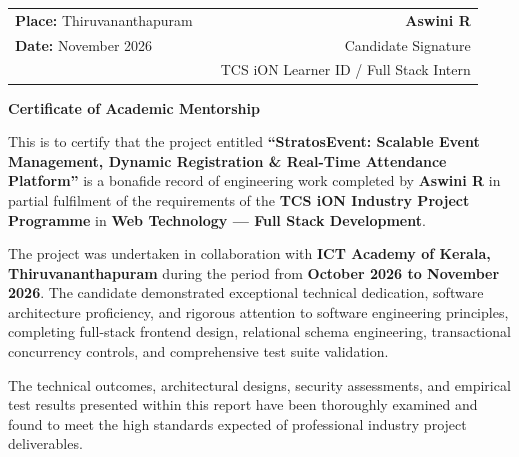\documentclass[11pt,a4paper]{report}
\begin{document}
\noindent
\begin{tabularx}{\textwidth}{lXr}
  \textbf{Place:} Thiruvananthapuram & & \textbf{Aswini R} \\
  \textbf{Date:} November 2026 & & Candidate Signature \\
  & & TCS iON Learner ID / Full Stack Intern
\end{tabularx}

\newpage
\thispagestyle{plain}

\vspace*{0.3in}

\begin{center}
  {\color{TitleBlue}\bfseries\fontsize{18}{22}\selectfont Certificate of Academic Mentorship\par}
\end{center}

\vspace{0.3in}

\noindent
This is to certify that the project entitled \textbf{``StratosEvent: Scalable Event Management, Dynamic Registration \& Real-Time Attendance Platform''} is a bonafide record of engineering work completed by \textbf{Aswini R} in partial fulfilment of the requirements of the \textbf{TCS iON Industry Project Programme} in \textbf{Web Technology --- Full Stack Development}.

\vspace{0.2in}
\noindent
The project was undertaken in collaboration with \textbf{ICT Academy of Kerala, Thiruvananthapuram} during the period from \textbf{October 2026 to November 2026}. The candidate demonstrated exceptional technical dedication, software architecture proficiency, and rigorous attention to software engineering principles, completing full-stack frontend design, relational schema engineering, transactional concurrency controls, and comprehensive test suite validation.

\vspace{0.2in}
\noindent
The technical outcomes, architectural designs, security assessments, and empirical test results presented within this report have been thoroughly examined and found to meet the high standards expected of professional industry project deliverables.

\vspace{0.8in}
\end{document}
